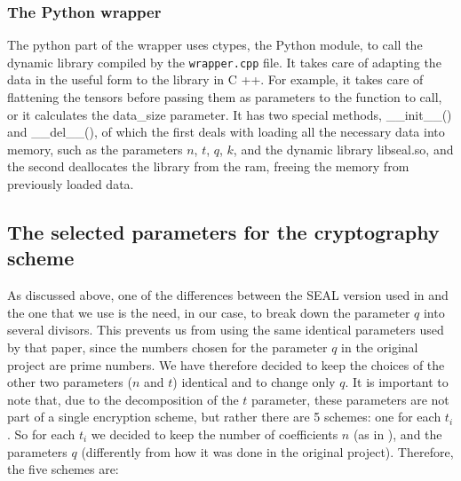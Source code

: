 \subsubsection{The Python wrapper}

The python part of the wrapper uses ctypes, the Python module, to call the dynamic library compiled by the \texttt{wrapper.cpp} file. It takes care of adapting the data in the useful form to the library in C ++. For example, it takes care of flattening the tensors before passing them as parameters to the function to call, or it calculates the data_size parameter. It has two special methods, __init__() and __del__(), of which the first deals with loading all the necessary data into memory, such as the parameters $n$, $t$, $q$, $k$, and the dynamic library libseal.so, and the second deallocates the library from the ram, freeing the memory from previously loaded data.

\subsection{The selected parameters for the cryptography scheme}

As discussed above, one of the differences between the SEAL version used in \cite{dowlin2016cryptonets} and the one that we use is the need, in our case, to break down the parameter $q$ into several divisors. This prevents us from using the same identical parameters used by that paper, since the numbers chosen for the parameter $q$ in the original project are prime numbers. We have therefore decided to keep the choices of the other two parameters ($n$ and $t$) identical and to change only $q$. It is important to note that, due to the decomposition of the $t$ parameter, these parameters are not part of a single encryption scheme, but rather there are 5 schemes: one for each $t_i$. So for each $t_i$ we decided to keep the number of coefficients $n$ (as in \cite{dowlin2016cryptonets}), and the parameters $q$ (differently from how it was done in the original project). Therefore, the five schemes are:

